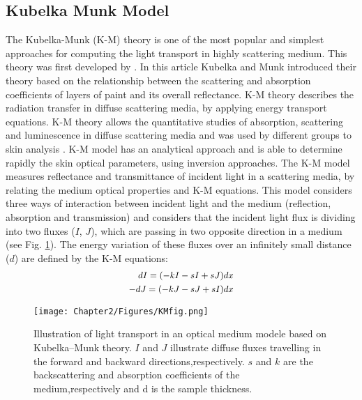 \subsection{Kubelka Munk Model}
The Kubelka-Munk (K-M) theory is one of the most popular and simplest approaches for computing the light transport in highly scattering medium. This theory was first developed by \cite{kubelka1931article}. In this article Kubelka and Munk introduced their theory based on the relationship between the scattering and absorption coefficients of layers of paint and its overall reflectance. K-M theory describes the radiation transfer in diffuse scattering media, by applying energy transport equations. K-M theory allows the quantitative studies of absorption, scattering and luminescence in diffuse scattering media and was used by different groups to skin analysis \cite{krishnaswamy2004biophysically,igarashi2007appearance,doi2003spectral,vyas2012computational,jolivot2011developpement}. 
K-M model has an analytical approach and is able to determine rapidly the skin optical parameters, using inversion approaches. 
The K-M model measures reflectance and transmittance of incident light in a scattering media, by relating the medium optical properties and K-M equations. This model considers three ways of interaction between incident light and the medium (reflection, absorption and transmission) and considers that the incident light flux is dividing into two fluxes ($I$, $J$), which are passing in two opposite direction in a medium (see Fig. \ref{fig:KMfig}). The energy variation of these fluxes over an infinitely small distance ($d$) are defined by the K-M equations:
	\begin{subequations}
	\small
	\begin{align}
	dI = (-kI-sI +sJ)dx\\
	-dJ = (-kJ -sJ+sI)dx
	\end{align}
	\label{Eq:KMEq}
	\end{subequations} 
	
	\begin{figure}[h]
	\centering 
	\texttt{[image: Chapter2/Figures/KMfig.png]}	
	\caption{Illustration of light transport in an optical medium modele based on Kubelka–Munk theory. $I$ and $J$ illustrate diffuse fluxes travelling in the forward and backward directions,respectively. $s$ and $k$ are the backscattering and absorption coefficients of the medium,respectively and d is the sample thickness. \cite{igarashi2007appearance}}
	\label{fig:KMfig}
	\end{figure} 
	
